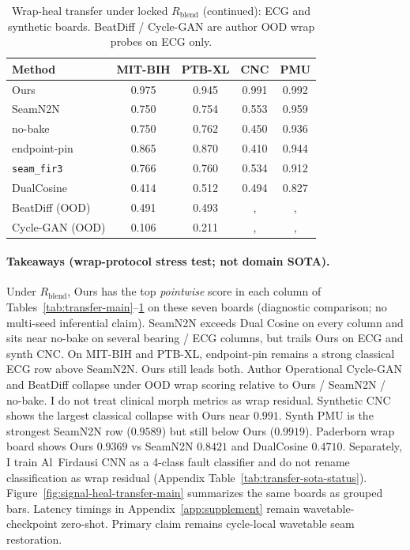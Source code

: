 \begin{table}[t]
  \centering
  \caption{Wrap-heal transfer under locked $R_{\mathrm{blend}}$ (continued): ECG and synthetic boards.
  BeatDiff / Cycle-GAN are author OOD wrap probes on ECG only.}
  \label{tab:transfer-main-b}
  \setlength{\tabcolsep}{2.5pt}
  \footnotesize
  \begin{tabular}{@{}lcccc@{}}
    \toprule
    Method & MIT-BIH & PTB-XL & CNC & PMU \\
    \midrule
    Ours & 0.975 & 0.945 & 0.991 & 0.992 \\
    SeamN2N & 0.750 & 0.754 & 0.553 & 0.959 \\
    no-bake & 0.750 & 0.762 & 0.450 & 0.936 \\
    endpoint-pin & 0.865 & 0.870 & 0.410 & 0.944 \\
    \texttt{seam\_fir3} & 0.766 & 0.760 & 0.534 & 0.912 \\
    DualCosine & 0.414 & 0.512 & 0.494 & 0.827 \\
    BeatDiff (OOD) & 0.491 & 0.493 &, &, \\
    Cycle-GAN (OOD) & 0.106 & 0.211 &, &, \\
    \bottomrule
  \end{tabular}
\end{table}

\paragraph{Takeaways (wrap-protocol stress test; not domain SOTA).}
Under $R_{\mathrm{blend}}$, Ours has the top \emph{pointwise} score in each column of Tables~\ref{tab:transfer-main}--\ref{tab:transfer-main-b} on these seven boards (diagnostic comparison; no multi-seed inferential claim).
SeamN2N exceeds Dual Cosine on every column and sits near no-bake on several bearing / ECG columns, but trails Ours
on ECG and synth CNC.
On MIT-BIH and PTB-XL, endpoint-pin remains a strong classical ECG row above SeamN2N. Ours still leads both.
Author Operational Cycle-GAN and BeatDiff collapse under OOD wrap scoring relative to Ours / SeamN2N / no-bake.
I do not treat clinical morph metrics as wrap residual.
Synthetic CNC shows the largest classical collapse with Ours near $0.991$.
Synth PMU is the strongest SeamN2N row ($0.9589$) but still below Ours ($0.9919$).
Paderborn wrap board shows Ours $0.9369$ vs SeamN2N $0.8421$ and DualCosine $0.4710$.
Separately, I train Al~Firdausi CNN as a 4-class fault classifier and do not rename classification as wrap residual
(Appendix Table~\ref{tab:transfer-sota-status}).
Figure~\ref{fig:signal-heal-transfer-main} summarizes the same boards as grouped bars.
Latency timings in Appendix~\ref{app:supplement} remain wavetable-checkpoint zero-shot.
Primary claim remains cycle-local wavetable seam restoration.

